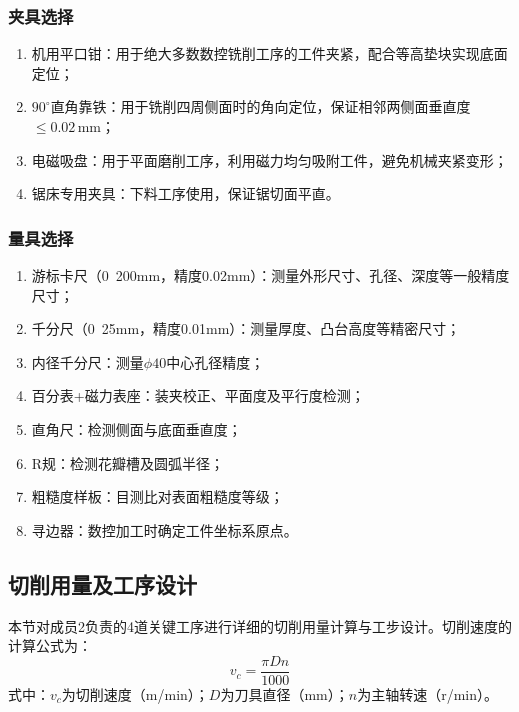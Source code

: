 \documentclass{xautCADreport}
\begin{document}
\subsubsection{夹具选择}

\begin{enumerate}
  \item 机用平口钳：用于绝大多数数控铣削工序的工件夹紧，配合等高垫块实现底面定位；
  \item $90^{\circ}$直角靠铁：用于铣削四周侧面时的角向定位，保证相邻两侧面垂直度$\leq0.02\,\mathrm{mm}$；
  \item 电磁吸盘：用于平面磨削工序，利用磁力均匀吸附工件，避免机械夹紧变形；
  \item 锯床专用夹具：下料工序使用，保证锯切面平直。
\end{enumerate}

\subsubsection{量具选择}

\begin{enumerate}
  \item 游标卡尺（0~200mm，精度0.02mm）：测量外形尺寸、孔径、深度等一般精度尺寸；
  \item 千分尺（0~25mm，精度0.01mm）：测量厚度、凸台高度等精密尺寸；
  \item 内径千分尺：测量$\phi40$中心孔径精度；
  \item 百分表+磁力表座：装夹校正、平面度及平行度检测；
  \item 直角尺：检测侧面与底面垂直度；
  \item R规：检测花瓣槽及圆弧半径；
  \item 粗糙度样板：目测比对表面粗糙度等级；
  \item 寻边器：数控加工时确定工件坐标系原点。
\end{enumerate}

\subsection{切削用量及工序设计}

本节对成员2负责的4道关键工序进行详细的切削用量计算与工步设计。切削速度的计算公式为：
\begin{equation}
  v_c = \frac{\pi D n}{1000}
  \label{eq:vc}
\end{equation}
\noindent 式中：$v_c$为切削速度（m/min）；$D$为刀具直径（mm）；$n$为主轴转速（r/min）。
\end{document}
